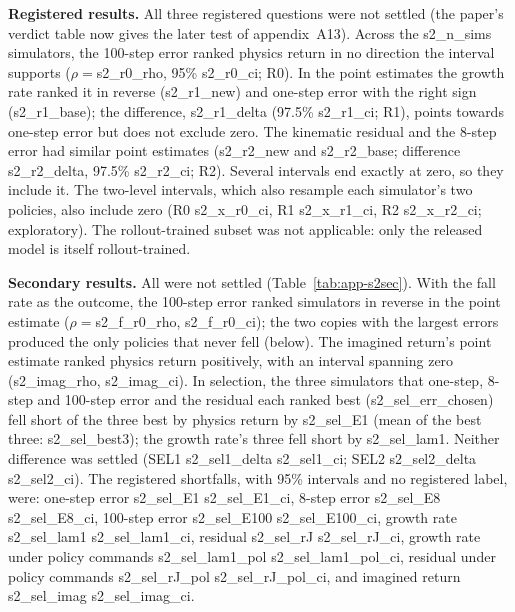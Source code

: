 \textbf{Registered results.} All three registered questions were not settled (the paper's verdict table now gives the later test of appendix~A13). Across the
{{s2_n_sims}} simulators, the 100-step error ranked physics return in no direction the interval supports ($\rho={}${{s2_r0_rho}}, 95\%
{{s2_r0_ci}}; R0). In the point estimates the growth rate ranked it in reverse ({{s2_r1_new}}) and one-step error with the right
sign ({{s2_r1_base}}); the difference, {{s2_r1_delta}} (97.5\% {{s2_r1_ci}}; R1), points towards one-step error but
does not exclude zero. The kinematic residual and the 8-step error had similar point estimates ({{s2_r2_new}} and
{{s2_r2_base}}; difference {{s2_r2_delta}}, 97.5\% {{s2_r2_ci}}; R2). Several intervals end exactly at zero, so they include it. The two-level intervals, which also
resample each simulator's two policies, also include zero (R0 {{s2_x_r0_ci}}, R1 {{s2_x_r1_ci}}, R2
{{s2_x_r2_ci}}; exploratory). The rollout-trained subset was not applicable: only the released model is itself
rollout-trained.

\textbf{Secondary results.} All were not settled (Table~\ref{tab:app-s2sec}). With the fall rate as the outcome, the
100-step error ranked simulators in reverse in the point estimate ($\rho={}${{s2_f_r0_rho}}, {{s2_f_r0_ci}}); the two copies with the
largest errors produced the only policies that never fell (below). The imagined return's point estimate ranked physics return
positively, with an interval spanning zero ({{s2_imag_rho}}, {{s2_imag_ci}}). In selection, the three simulators that one-step, 8-step and 100-step
error and the residual each ranked best ({{s2_sel_err_chosen}}) fell short of the three best by physics return by
{{s2_sel_E1}} (mean of the best three: {{s2_sel_best3}}); the growth rate's three fell short by {{s2_sel_lam1}}. Neither
difference was settled (SEL1 {{s2_sel1_delta}} {{s2_sel1_ci}}; SEL2 {{s2_sel2_delta}} {{s2_sel2_ci}}). The registered shortfalls,
with 95\% intervals and no registered label, were: one-step error {{s2_sel_E1}} {{s2_sel_E1_ci}}, 8-step error {{s2_sel_E8}}
{{s2_sel_E8_ci}}, 100-step error {{s2_sel_E100}} {{s2_sel_E100_ci}}, growth rate {{s2_sel_lam1}} {{s2_sel_lam1_ci}}, residual
{{s2_sel_rJ}} {{s2_sel_rJ_ci}}, growth rate under policy commands {{s2_sel_lam1_pol}} {{s2_sel_lam1_pol_ci}}, residual under
policy commands {{s2_sel_rJ_pol}} {{s2_sel_rJ_pol_ci}}, and imagined return {{s2_sel_imag}} {{s2_sel_imag_ci}}.

